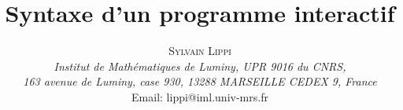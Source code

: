 
\usepackage{epic,eepic}
\usepackage{amsmath}
\usepackage{amssymb}
\usepackage[french]{babel}




\textheight=20.5cm
\textwidth=14.4cm

\title{Syntaxe d'un programme interactif}

\author{
	\textsc{Sylvain Lippi}													\\
	\textit{Institut de Math\'ematiques de Luminy, UPR 9016 du CNRS,}		\\
	\textit{163 avenue de Luminy, case 930, 13288 MARSEILLE CEDEX 9, France}\\
	Email: lippi@iml.univ-mrs.fr
}

